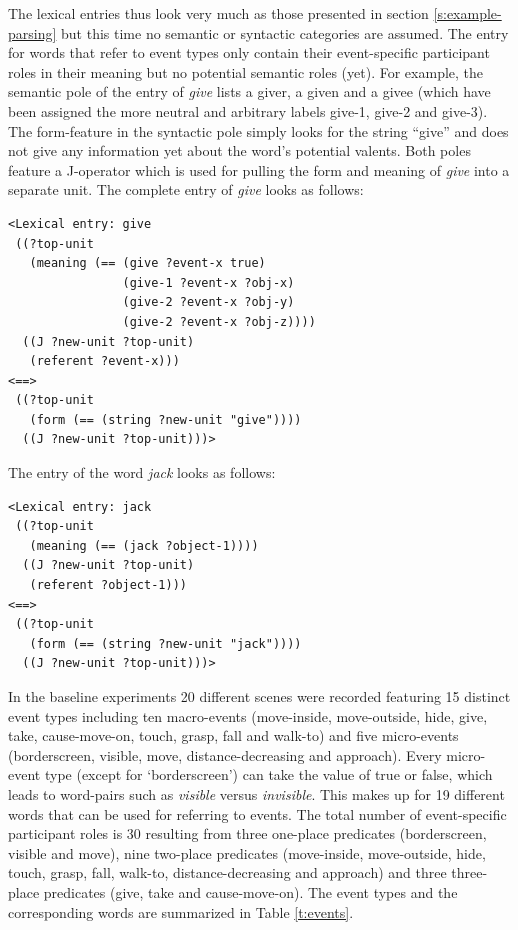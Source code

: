 The lexical entries thus look very much as those presented in section \ref{s:example-parsing} but this time no semantic or syntactic categories are assumed. The entry for words that refer to event types only contain their event-specific participant roles in their meaning but no potential semantic roles (yet). For example, the semantic pole of the entry of {\em give} lists a giver, a given and a givee (which have been assigned the more neutral and arbitrary labels give-1, give-2 and give-3). The form-feature in the syntactic pole simply looks for the string ``give'' and does not give any information yet about the word's potential valents. Both poles feature a J-operator which is used for pulling the form and meaning of {\em give} into a separate unit. The complete entry of {\em give} looks as follows:
 
\ea
\begin{lstlisting} 
<Lexical entry: give
 ((?top-unit
   (meaning (== (give ?event-x true)
                (give-1 ?event-x ?obj-x)
                (give-2 ?event-x ?obj-y)
                (give-2 ?event-x ?obj-z))))
  ((J ?new-unit ?top-unit)
   (referent ?event-x)))
<==>
 ((?top-unit
   (form (== (string ?new-unit "give"))))
  ((J ?new-unit ?top-unit)))>
\end{lstlisting}
\z

 
The entry of the word {\em jack} looks as follows:
\ea 
\begin{lstlisting}
<Lexical entry: jack
 ((?top-unit
   (meaning (== (jack ?object-1))))
  ((J ?new-unit ?top-unit)
   (referent ?object-1)))
<==>
 ((?top-unit
   (form (== (string ?new-unit "jack"))))
  ((J ?new-unit ?top-unit)))>
\end{lstlisting}
\z

In the baseline experiments 20 different scenes were recorded featuring 15 distinct event types including ten macro-events (move-inside, move-outside, hide, give, take, cause-move-on, touch, grasp, fall and walk-to) and five micro-events (borderscreen, visible, move, distance-decreasing and approach). Every micro-event type (except for `borderscreen') can take the value of true or false, which leads to word-pairs such as {\em visible} versus {\em invisible}. This makes up for 19 different words that can be used for referring to events. The total number of event-specific participant roles is 30 resulting from three one-place predicates (borderscreen, visible and move), nine two-place predicates (move-inside, move-outside, hide, touch, grasp, fall, walk-to, distance-decreasing and approach) and three three-place predicates (give, take and cause-move-on). The event types and the corresponding words are summarized in Table \ref{t:events}.

